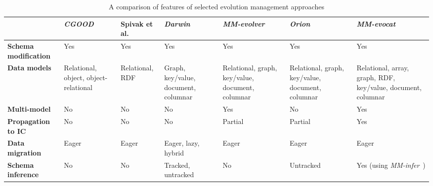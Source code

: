 \begin{table}[t]
\centering
\scriptsize
\caption{A comparison of features of selected evolution management approaches}
\begin{tabular}{
    >{\raggedright\arraybackslash}p{25mm}
    >{\raggedright\arraybackslash}p{15mm}
    >{\raggedright\arraybackslash}p{15mm}
    >{\raggedright\arraybackslash}p{15mm}
    >{\raggedright\arraybackslash}p{15mm}
    >{\raggedright\arraybackslash}p{15mm}
    >{\raggedright\arraybackslash}p{15mm}
    }
\toprule
    & \textbf{\textit{CGOOD}}\newline \citep{tuijn1996}    & \textbf{Spivak et al.} \citep{spivak2015relational}&  \textbf{\textit{Darwin}}\newline \citep{storl2022darwin}   & \textbf{\emph{MM-evolver}}~\citep{DBLP:journals/dke/HolubovaVS21}   & \textbf{\textit{Orion}%
    }\newline\citep{chillon2022taxonomy}  & \textbf{\emph{MM-evocat}}~\citep{cikm_2022} \\
\midrule
\textbf{Schema modification}    & Yes       & Yes                & Yes       & Yes               & Yes           & Yes           \\
\textbf{Data models} & Relational, object, object-relational
                     & Relational, RDF
                     & Graph, key/value, document, columnar
                     & Relational, graph, key/value, document, columnar
                     & Relational, graph, key/value, document, columnar 
                     & Relational, array, graph, RDF, key/value, document, columnar \\
\textbf{Multi-model}            & No        & No        & No       & Yes                & No            & Yes           \\
\textbf{Propagation to IC}      & No        & No               & No   & Partial                & Partial             & Yes           \\
\textbf{Data migration}         & Eager     & Eager              & Eager, lazy, hybrid     & Eager               & Eager           & Eager           \\
\textbf{Schema inference}       & No        & No                & Tracked, untracked        & No    & Untracked & Yes (using \textit{MM-infer}{}~\citep{mm_infer})            \\

\end{tabular}
\end{table}
